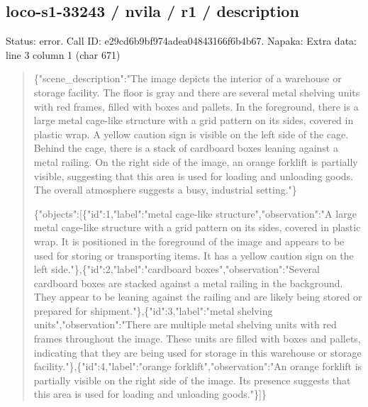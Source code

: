 \documentclass[10pt,a4paper]{article}
\begin{document}
\subsection*{loco-s1-33243 / nvila / r1 / description}
Status: error. Call ID: e29cd6b9bf974adea04843166f6b4b67. Napaka: Extra data: line 3 column 1 (char 671)
\begin{quote}\footnotesize
\{"scene\_description":\allowbreak{}"The image depicts the interior of a warehouse or storage facility. The floor is gray and there are several metal shelving units with red frames,\allowbreak{} filled with boxes and pallets. In the foreground,\allowbreak{} there is a large metal cage-like structure with a grid pattern on its sides,\allowbreak{} covered in plastic wrap. A yellow caution sign is visible on the left side of the cage. Behind the cage,\allowbreak{} there is a stack of cardboard boxes leaning against a metal railing. On the right side of the image,\allowbreak{} an orange forklift is partially visible,\allowbreak{} suggesting that this area is used for loading and unloading goods. The overall atmosphere suggests a busy,\allowbreak{} industrial setting."\}\par
\par
\{"objects":\allowbreak{}[\{"id":\allowbreak{}1,\allowbreak{}"label":\allowbreak{}"met\allowbreak{}al cage-like structure",\allowbreak{}"observation":\allowbreak{}"A large metal cage-like structure with a grid pattern on its sides,\allowbreak{} covered in plastic wrap. It is positioned in the foreground of the image and appears to be used for storing or transporting items. It has a yellow caution sign on the left side."\},\allowbreak{}\{"id":\allowbreak{}2,\allowbreak{}"label":\allowbreak{}"cardboa\allowbreak{}rd boxes",\allowbreak{}"observation":\allowbreak{}"Several cardboard boxes are stacked against a metal railing in the background. They appear to be leaning against the railing and are likely being stored or prepared for shipment."\},\allowbreak{}\{"id":\allowbreak{}3,\allowbreak{}"label":\allowbreak{}"met\allowbreak{}al shelving units",\allowbreak{}"observation":\allowbreak{}"There are multiple metal shelving units with red frames throughout the image. These units are filled with boxes and pallets,\allowbreak{} indicating that they are being used for storage in this warehouse or storage facility."\},\allowbreak{}\{"id":\allowbreak{}4,\allowbreak{}"label":\allowbreak{}"ora\allowbreak{}nge forklift",\allowbreak{}"observation":\allowbreak{}"An orange forklift is partially visible on the right side of the image. Its presence suggests that this area is used for loading and unloading goods."\}]\}
\end{quote}
\end{document}
